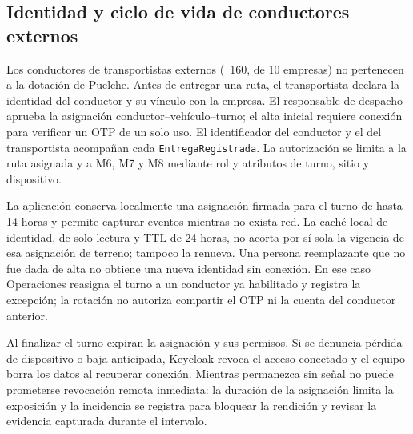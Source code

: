 \subsection{Identidad y ciclo de vida de conductores externos}
\label{sec:conductores-externos}

Los conductores de transportistas externos (~160, de 10 empresas) no pertenecen a la dotación de Puelche. Antes de entregar una ruta, el transportista declara la identidad del conductor y su vínculo con la empresa. El responsable de despacho aprueba la asignación conductor--vehículo--turno; el alta inicial requiere conexión para verificar un OTP de un solo uso. El identificador del conductor y el del transportista acompañan cada \texttt{EntregaRegistrada}. La autorización se limita a la ruta asignada y a M6, M7 y M8 mediante rol y atributos de turno, sitio y dispositivo.

La aplicación conserva localmente una asignación firmada para el turno de hasta 14 horas y permite capturar eventos mientras no exista red. La caché local de identidad, de solo lectura y TTL de 24 horas, no acorta por sí sola la vigencia de esa asignación de terreno; tampoco la renueva. Una persona reemplazante que no fue dada de alta no obtiene una nueva identidad sin conexión. En ese caso Operaciones reasigna el turno a un conductor ya habilitado y registra la excepción; la rotación no autoriza compartir el OTP ni la cuenta del conductor anterior.

Al finalizar el turno expiran la asignación y sus permisos. Si se denuncia pérdida de dispositivo o baja anticipada, Keycloak revoca el acceso conectado y el equipo borra los datos al recuperar conexión. Mientras permanezca sin señal no puede prometerse revocación remota inmediata: la duración de la asignación limita la exposición y la incidencia se registra para bloquear la rendición y revisar la evidencia capturada durante el intervalo.

